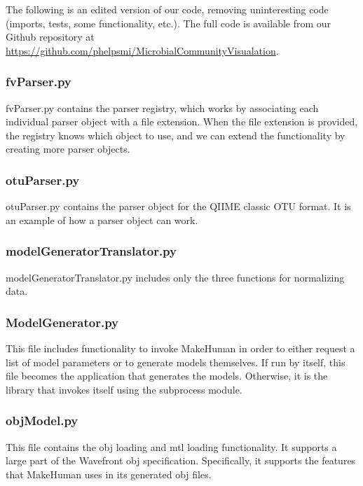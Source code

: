 \documentclass[letterpaper,10pt, onecolumn, draftclsnofoot]{IEEEtran}
\begin{document}
The following is an edited version of our code, removing uninteresting code (imports, tests, some functionality, etc.). The full code is available from our Github repository at \url{https://github.com/phelpsmi/MicrobialCommunityVisualation}.

\subsubsection{fvParser.py}
fvParser.py contains the parser registry, which works by associating each individual parser object with a file extension. When the file extension is provided, the registry knows which object to use, and we can extend the functionality by creating more parser objects.



\subsubsection{otuParser.py}
otuParser.py contains the parser object for the QIIME classic OTU format. It is an example of how a parser object can work.



\subsubsection{modelGeneratorTranslator.py}
modelGeneratorTranslator.py includes only the three functions for normalizing data. 



\subsubsection{ModelGenerator.py}
This file includes functionality to invoke MakeHuman in order to either request a list of model parameters or to generate models themselves. If run by itself, this file becomes the application that generates the models. Otherwise, it is the library that invokes itself using the subprocess module. 



\subsubsection{objModel.py}
This file contains the obj loading and mtl loading functionality. It supports a large part of the Wavefront obj specification. Specifically, it supports the features that MakeHuman uses in its generated obj files.


\end{document}
